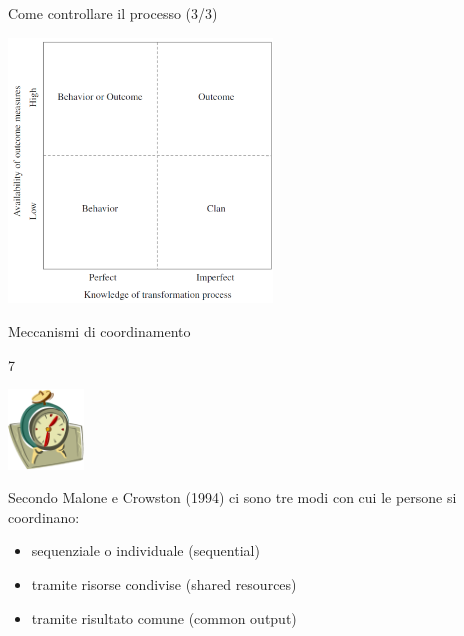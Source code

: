 \documentclass{beamer}
\begin{document}
\begin{frame}{\centerline{Come controllare il processo (3/3)}}


\begin{center}
\includegraphics[width=70mm]{A2022.IDSEPC.ProcessoDiProduzione/img-img03.png}
\end{center}
\end{frame}

\begin{frame}{\centerline{Meccanismi di coordinamento}}
7
\begin{center}
\includegraphics[width=20mm]{A2022.IDSEPC.ProcessoDiProduzione/img-img10.png}
\end{center}

Secondo Malone e Crowston (1994) ci sono tre modi con cui le persone si coordinano:
\begin{itemize}
\item  sequenziale o individuale (sequential)
\item  tramite risorse condivise (shared resources)
\item  tramite risultato comune (common output)
\end{itemize}

\end{frame}
\end{document}
